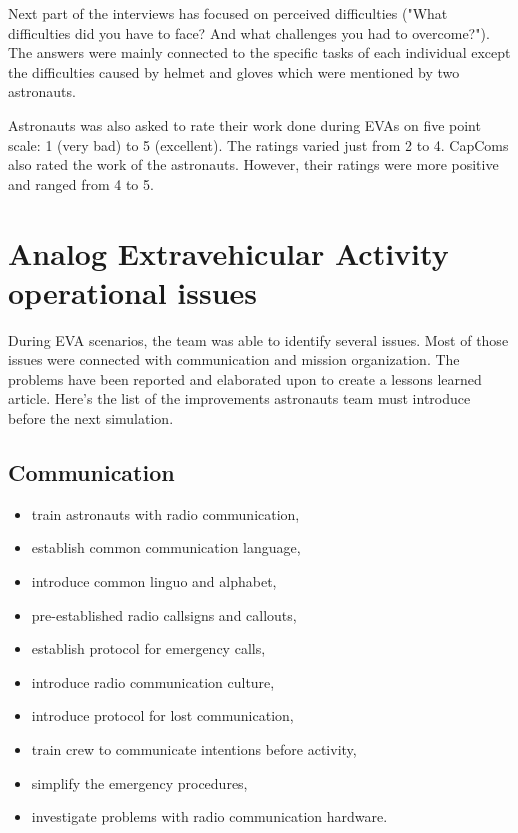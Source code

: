 \documentclass[preprint]{elsarticle}
\begin{document}
Next part of the interviews has focused on perceived difficulties ("What difficulties did you have to face? And what challenges you had to overcome?"). The answers were mainly connected to the specific tasks of each individual except the difficulties caused by helmet and gloves which were mentioned by two astronauts.

Astronauts was also asked to rate their work done during EVAs on five point scale: 1 (very bad) to 5 (excellent). The ratings varied just from 2 to 4. CapComs also rated the work of the astronauts. However, their ratings were more positive and ranged from 4 to 5.

\section{Analog Extravehicular Activity operational issues}
During EVA scenarios, the team was able to identify several issues. Most of those issues were connected with communication and mission organization. The problems have been reported and elaborated upon to create a lessons learned article. Here's the list of the improvements astronauts team must introduce before the next simulation.

\subsection{Communication}
\begin{itemize}
\item train astronauts with radio communication,
\item establish common communication language,
\item introduce common linguo and alphabet,
\item pre-established radio callsigns and callouts,
\item establish protocol for emergency calls,
\item introduce radio communication culture,
\item introduce protocol for lost communication,
\item train crew to communicate intentions before activity,
\item simplify the emergency procedures,
\item investigate problems with radio communication hardware.
\end{itemize}
\end{document}
